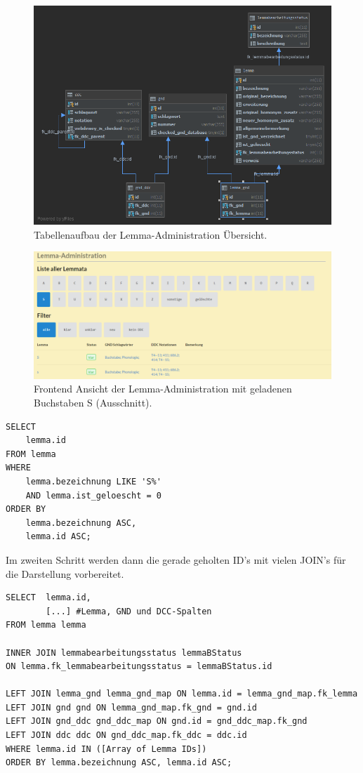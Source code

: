 \begin{figure}
	\centering
	\includegraphics[width=0.8\linewidth]{images/structure_lemmaadministration.png}
	\caption{Tabellenaufbau der Lemma-Administration Übersicht.}
	\label{img:lAdminStructure}
\end{figure}

\begin{figure}
	\centering
	\includegraphics[width=1\linewidth]{images/lemmaadministration_sample.PNG}
	\caption{Frontend Ansicht der Lemma-Administration mit geladenen Buchstaben S (Ausschnitt).}
	\label{img:lAdminSample}
\end{figure}

\lstset{language=SQL}
\begin{lstlisting}[frame=single] 
    SELECT
    lemma.id
FROM lemma
WHERE
    lemma.bezeichnung LIKE 'S%'
    AND lemma.ist_geloescht = 0
ORDER BY
    lemma.bezeichnung ASC,
    lemma.id ASC;
\end{lstlisting}

Im zweiten Schritt werden dann die gerade geholten ID’s mit vielen JOIN’s für die Darstellung vorbereitet.

\lstset{language=SQL}
\begin{lstlisting}[frame=single, label={lst:sqlQuery}] 
SELECT  lemma.id,                        
        [...] #Lemma, GND und DCC-Spalten        
FROM lemma lemma
      
INNER JOIN lemmabearbeitungsstatus lemmaBStatus
ON lemma.fk_lemmabearbeitungsstatus = lemmaBStatus.id

LEFT JOIN lemma_gnd lemma_gnd_map ON lemma.id = lemma_gnd_map.fk_lemma
LEFT JOIN gnd gnd ON lemma_gnd_map.fk_gnd = gnd.id
LEFT JOIN gnd_ddc gnd_ddc_map ON gnd.id = gnd_ddc_map.fk_gnd
LEFT JOIN ddc ddc ON gnd_ddc_map.fk_ddc = ddc.id
WHERE lemma.id IN ([Array of Lemma IDs])
ORDER BY lemma.bezeichnung ASC, lemma.id ASC;

\end{lstlisting}
